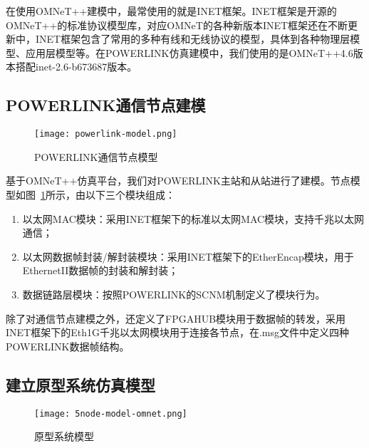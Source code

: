在使用OMNeT++建模中，最常使用的就是INET框架。INET框架是开源的OMNeT++的标准协议模型库，对应OMNeT的各种新版本INET框架还在不断更新中，INET框架包含了常用的多种有线和无线协议的模型，具体到各种物理层模型、应用层模型等。在POWERLINK仿真建模中，我们使用的是OMNeT++4.6版本搭配inet-2.6-b673687版本。

\subsection{POWERLINK通信节点建模}

\begin{figure}[!htb]
  \centering
  \texttt{[image: powerlink-model.png]}
  \caption{POWERLINK通信节点模型}
  \label{fig:powerlink-model}
\end{figure}
基于OMNeT++仿真平台，我们对POWERLINK主站和从站进行了建模。节点模型如图~\ref{fig:powerlink-model}所示，由以下三个模块组成：

\begin{enumerate}
  \item 以太网MAC模块：采用INET框架下的标准以太网MAC模块，支持千兆以太网通信；
  \item 以太网数据帧封装/解封装模块：采用INET框架下的EtherEncap模块，用于EthernetII数据帧的封装和解封装；
  \item 数据链路层模块：按照POWERLINK的SCNM机制定义了模块行为。
\end{enumerate}

除了对通信节点建模之外，还定义了FPGAHUB模块用于数据帧的转发，采用INET框架下的Eth1G千兆以太网模块用于连接各节点，在.msg文件中定义四种POWERLINK数据帧结构。

\subsection{建立原型系统仿真模型}

\begin{figure}[!htb]
  \centering
  \texttt{[image: 5node-model-omnet.png]}
  \caption{原型系统模型}
  \label{fig:5node-model-omnet}
\end{figure}

